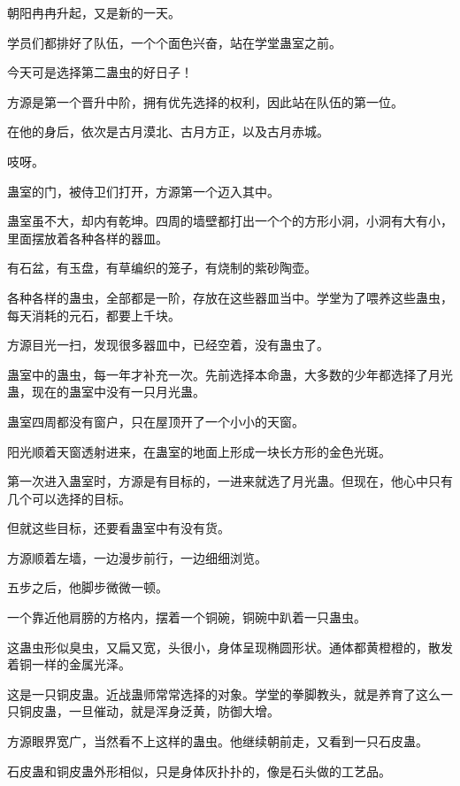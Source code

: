
\begin{this_body}

朝阳冉冉升起，又是新的一天。

学员们都排好了队伍，一个个面色兴奋，站在学堂蛊室之前。

今天可是选择第二蛊虫的好日子！

方源是第一个晋升中阶，拥有优先选择的权利，因此站在队伍的第一位。

在他的身后，依次是古月漠北、古月方正，以及古月赤城。

吱呀。

蛊室的门，被侍卫们打开，方源第一个迈入其中。

蛊室虽不大，却内有乾坤。四周的墙壁都打出一个个的方形小洞，小洞有大有小，里面摆放着各种各样的器皿。

有石盆，有玉盘，有草编织的笼子，有烧制的紫砂陶壶。

各种各样的蛊虫，全部都是一阶，存放在这些器皿当中。学堂为了喂养这些蛊虫，每天消耗的元石，都要上千块。

方源目光一扫，发现很多器皿中，已经空着，没有蛊虫了。

蛊室中的蛊虫，每一年才补充一次。先前选择本命蛊，大多数的少年都选择了月光蛊，现在的蛊室中没有一只月光蛊。

蛊室四周都没有窗户，只在屋顶开了一个小小的天窗。

阳光顺着天窗透射进来，在蛊室的地面上形成一块长方形的金色光斑。

第一次进入蛊室时，方源是有目标的，一进来就选了月光蛊。但现在，他心中只有几个可以选择的目标。

但就这些目标，还要看蛊室中有没有货。

方源顺着左墙，一边漫步前行，一边细细浏览。

五步之后，他脚步微微一顿。

一个靠近他肩膀的方格内，摆着一个铜碗，铜碗中趴着一只蛊虫。

这蛊虫形似臭虫，又扁又宽，头很小，身体呈现椭圆形状。通体都黄橙橙的，散发着铜一样的金属光泽。

这是一只铜皮蛊。近战蛊师常常选择的对象。学堂的拳脚教头，就是养育了这么一只铜皮蛊，一旦催动，就是浑身泛黄，防御大增。

方源眼界宽广，当然看不上这样的蛊虫。他继续朝前走，又看到一只石皮蛊。

石皮蛊和铜皮蛊外形相似，只是身体灰扑扑的，像是石头做的工艺品。


\end{this_body}
